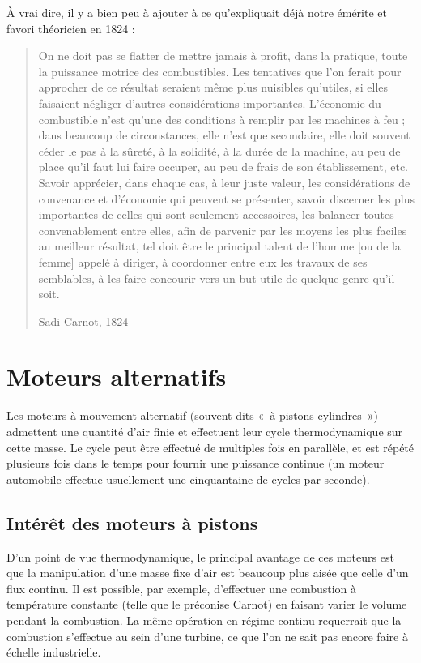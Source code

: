 		À vrai dire, il y a bien peu à ajouter à ce qu’expliquait déjà notre émérite et favori théoricien en 1824 :

		\begin{quote}
			On ne doit pas se flatter de mettre jamais à profit, dans la pratique, toute la puissance motrice des combustibles. Les tentatives que l’on ferait pour approcher de ce résultat seraient même plus nuisibles qu’utiles, si elles faisaient négliger d’autres considérations importantes. L’économie du combustible n’est qu’une des conditions à remplir par les machines à feu ; dans beaucoup de circonstances, elle n’est que secondaire, elle doit souvent céder le pas à la sûreté, à la solidité, à la durée de la machine, au peu de place qu’il faut lui faire occuper, au peu de frais de son établissement, etc. Savoir apprécier, dans chaque cas, à leur juste valeur, les considérations de convenance et d’économie qui peuvent se présenter, savoir discerner les plus importantes de celles qui sont seulement accessoires, les balancer toutes convenablement entre elles, afin de parvenir par les moyens les plus faciles au meilleur résultat, tel doit être le principal talent de l’homme [ou de la femme] appelé à diriger, à coordonner entre eux les travaux de ses semblables, à les faire concourir vers un but utile de quelque genre qu’il soit.
			\begin{flushright}
				Sadi Carnot, 1824~\cite{carnot1824}
			\end{flushright}
		\end{quote}



\section{Moteurs alternatifs}
\label{ch_moteurs_alternatifs}

Les moteurs à mouvement alternatif (souvent dits «~à pistons-cylindres~») admettent une quantité d’air finie et effectuent leur cycle thermodynamique sur cette masse. Le cycle peut être effectué de multiples fois en parallèle, et est répété plusieurs fois dans le temps pour fournir une puissance continue (un moteur automobile effectue usuellement une cinquantaine de cycles par seconde).

	\subsection{Intérêt des moteurs à pistons}

		D’un point de vue thermodynamique, le principal avantage de ces moteurs est que la manipulation d’une masse fixe d’air est beaucoup plus aisée que celle d’un flux continu. Il est possible, par exemple, d’effectuer une combustion à température constante (telle que le préconise Carnot) en faisant varier le volume pendant la combustion. La même opération en régime continu requerrait que la combustion s’effectue au sein d’une turbine, ce que l’on ne sait pas encore faire à échelle industrielle.

